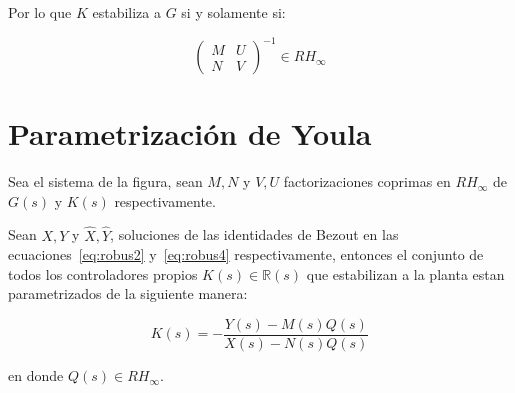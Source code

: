         Por lo que $K$ estabiliza a $G$ si y solamente si:

        \begin{equation*}
            \begin{pmatrix}
                M & U \\
                N & V
            \end{pmatrix}^{-1} \in RH_{\infty}
        \end{equation*}

    \section{Parametrización de Youla}

        \begin{teorema}
            Sea el sistema de la figura, sean $M, N$ y $V, U$ factorizaciones coprimas en $RH_{\infty}$ de $G(s)$ y $K(s)$ respectivamente.

            Sean $X, Y$ y $\hat{X}, \hat{Y}$, soluciones de las identidades de Bezout en las ecuaciones~\ref{eq:robus2} y~\ref{eq:robus4} respectivamente, entonces el conjunto de todos los controladores propios $K(s) \in \mathbb{R}(s)$ que estabilizan a la planta estan parametrizados de la siguiente manera:

            \begin{equation} \label{eq:robus5}
                K(s) = - \frac{Y(s) - M(s) Q(s)}{X(s) - N(s)Q(s)}
            \end{equation}

            en donde $Q(s) \in RH_{\infty}$.
        \end{teorema}

